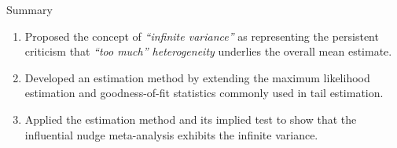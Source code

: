 \documentclass{beamer} %
\begin{document}
\begin{frame}{Summary}
    \begin{enumerate}
        \item Proposed the concept of \textit{``infinite variance''} as representing the persistent criticism that \textit{``too much'' heterogeneity} underlies the overall mean estimate.
        
        \bigskip
        
        \item Developed an estimation method by extending the maximum likelihood estimation and goodness-of-fit statistics commonly used in tail estimation.
        
        \bigskip
        
        \item Applied the estimation method and its implied test to show that the influential nudge meta-analysis exhibits the infinite variance.
    \end{enumerate}
\end{frame}
\end{document}
